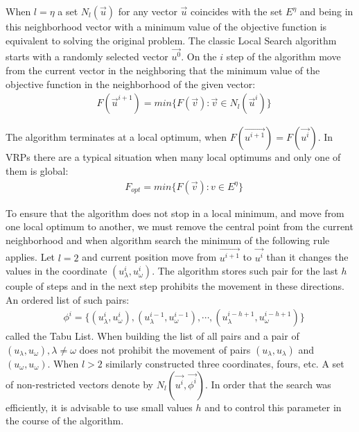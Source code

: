 \documentclass[]{TAACpaper}
\begin{document}
When $l=\eta$ a set $ N_l(\vec{u})$ for any vector $\vec{u}$ coincides with the set $E^{\eta}$ and being in this neighborhood vector with a minimum value of the objective function is equivalent to solving the original problem. The classic Local Search algorithm starts with a randomly selected vector $\vec{u^0}$.
On the $i$ step of the algorithm move from the current vector in the neighboring that the minimum value of the objective function in the neighborhood of the given vector:
\begin{align} 
& F(\vec{u}^{i+1})=min\{F(\vec{v}):\vec{v} \in N_l(\vec{u}^i)\}
\end{align}	

The algorithm terminates at a local optimum, when $F(\vec{u^{i+1}})=F(\vec{u^i})$. In VRPs there are a typical situation when many local optimums and only one of them is global:
\begin{align} 
& F_{opt}=min\{F(\vec{v}):v \in E^{\eta}\}
\end{align}	

To ensure that the algorithm does not stop in a local minimum, and move from one local optimum to another, we must remove the central point  from the current neighborhood and when algorithm search the minimum of the following rule applies. Let $l=2$ and current position move from $\vec{u^{i+1}}$ to $\vec{u^i}$ than it changes the values in the coordinate $(u_\lambda^{i}, u_\omega^{i})$. The algorithm stores such pair for the last $h$ couple of steps and in the next step prohibits the movement in these directions. An ordered list of such pairs:
\begin{align} 
& \phi^i=\{(u_\lambda^{i},u_\omega^{i}),(u_\lambda^{i-1},u_\omega^{i-1}),\cdots,(u_\lambda^{i-h+1},u_\omega^{i-h+1}) \} 
\end{align}	
called the Tabu List. When building the list of all pairs and a pair of $(u_\lambda,u_\omega),\lambda \ne \omega$ does not prohibit the movement of pairs $(u_\lambda,u_\lambda)$ and $(u_\omega,u_\omega)$. When $l>2$ similarly constructed three coordinates, fours, etc. A set of non-restricted vectors denote by $N_l(\vec{u^i},\vec{\phi^i})$. In order that the search was efficiently, it is advisable to use small values $h$ and to control this parameter in the course of the algorithm.
\end{document}
